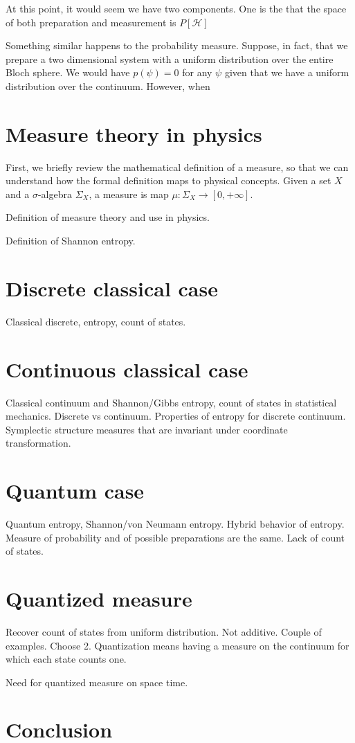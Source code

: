 \documentclass[10pt,twocolumn, nofootinbib]{revtex4-2}
\begin{document}
At this point, it would seem we have two components. One is the that the space of both preparation and measurement is $P[\mathcal{H}]$

Something similar happens to the probability measure. Suppose, in fact, that we prepare a two dimensional system with a uniform distribution over the entire Bloch sphere. We would have $p(\psi) = 0$ for any $\psi$ given that we have a uniform distribution over the continuum. However, when 

\section{Measure theory in physics}

First, we briefly review the mathematical definition of a measure, so that we can understand how the formal definition maps to physical concepts. Given a set $X$ and a $\sigma$-algebra $\Sigma_X$, a measure is map $\mu : \Sigma_X \to [0,+\infty]$.

Definition of measure theory and use in physics.

Definition of Shannon entropy.

\section{Discrete classical case}

Classical discrete, entropy, count of states.

\section{Continuous classical case}

Classical continuum and Shannon/Gibbs entropy, count of states in statistical mechanics. Discrete vs continuum. Properties of entropy for discrete continuum. Symplectic structure measures that are invariant under coordinate transformation.

\section{Quantum case}

Quantum entropy, Shannon/von Neumann entropy. Hybrid behavior of entropy. Measure of probability and of possible preparations are the same. Lack of count of states.

\section{Quantized measure}

Recover count of states from uniform distribution. Not additive. Couple of examples. Choose 2. Quantization means having a measure on the continuum for which each state counts one.

Need for quantized measure on space time.

\section{Conclusion}



\newcommand{\pj}[1] {\underbar{$#1$}}
\end{document}
